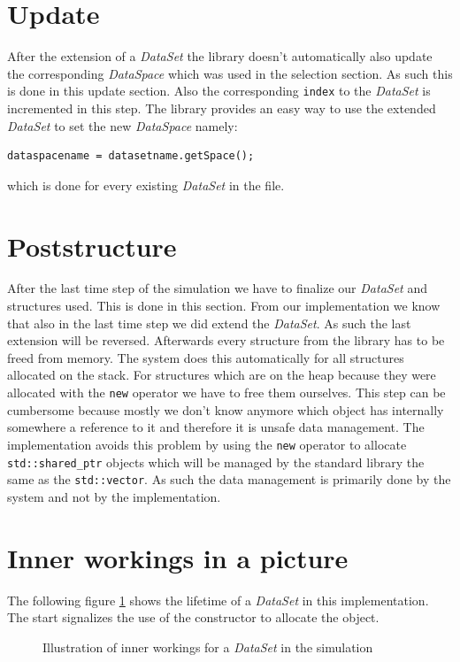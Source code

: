 \section{Update}
After the extension of a \textit{DataSet} the library doesn't automatically also update the corresponding \textit{DataSpace} which was used in the selection section. As such this is done in this update section. Also the corresponding \texttt{index} to the \textit{DataSet} is incremented in this step. The library provides an easy way to use the extended \textit{DataSet} to set the new \textit{DataSpace} namely:
\begin{lstlisting}
dataspacename = datasetname.getSpace();
\end{lstlisting}
which is done for every existing \textit{DataSet} in the file.
\section{Poststructure}
After the last time step of the simulation we have to finalize our \textit{DataSet} and structures used. This is done in this section. From our implementation we know that also in the last time step we did extend the \textit{DataSet}. As such the last extension will be reversed. Afterwards every structure from the library has to be freed from memory. The system does this automatically for all structures allocated on the stack. For structures which are on the heap because they were allocated with the \texttt{new} operator we have to free them ourselves. This step can be cumbersome because mostly we don't know anymore which object has internally somewhere a reference to it and therefore it is unsafe data management. The implementation avoids this problem by using the \texttt{new} operator to allocate \texttt{std::shared\_ptr} objects which will be managed by the standard library the same as the \texttt{std::vector}. As such the data management is primarily done by the system and not by the implementation.
\section{Inner workings in a picture}
The following figure \ref{fig:illustration} shows the lifetime of a \textit{DataSet} in this implementation. The start signalizes the use of the constructor to allocate the object.
\begin{figure}[ht!]
\caption{Illustration of inner workings for a \textit{DataSet} in the simulation}
\label{fig:illustration}
\end{figure}


